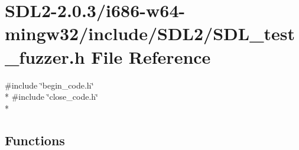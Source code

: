 \hypertarget{i686-w64-mingw32_2include_2SDL2_2SDL__test__fuzzer_8h}{\section{S\+D\+L2-\/2.0.3/i686-\/w64-\/mingw32/include/\+S\+D\+L2/\+S\+D\+L\+\_\+test\+\_\+fuzzer.h File Reference}
\label{i686-w64-mingw32_2include_2SDL2_2SDL__test__fuzzer_8h}
}
{\ttfamily \#include \char`\"{}begin\+\_\+code.\+h\char`\"{}}\\*
{\ttfamily \#include \char`\"{}close\+\_\+code.\+h\char`\"{}}\\*
\subsection*{Functions}

